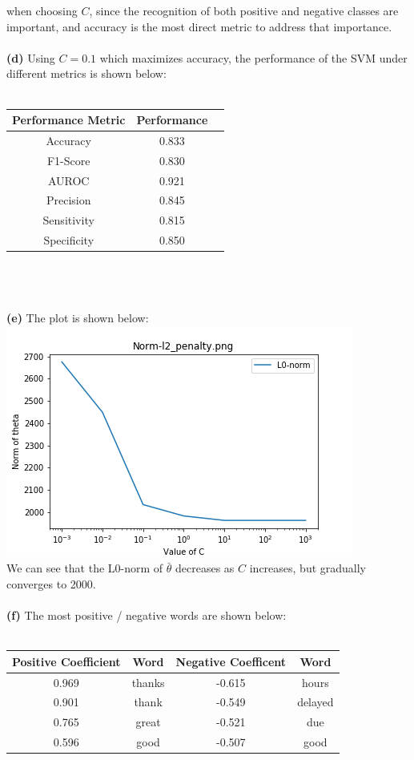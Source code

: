 \documentclass{article}
\begin{document}
when choosing $C$, since the recognition of both positive and negative classes
are important, and accuracy is the most direct metric to address that importance.\\ \\
\textbf{(d)} Using $C=0.1$ which maximizes accuracy, the performance of the SVM under different metrics is shown below: \\ \\
\begin{tabular}{|c|c|c|}
\hline
\bf Performance Metric & \bf Performance \\ \hline
Accuracy &  0.833 \\ \hline
F1-Score &  0.830 \\ \hline
AUROC &  0.921 \\ \hline
Precision &  0.845 \\ \hline
Sensitivity &  0.815 \\ \hline
Specificity &  0.850 \\ \hline
\end{tabular}\\ \\ \\
\textbf{(e)} The plot is shown below:\\
\includegraphics[width=.5\textwidth]{31e.png}\\
\indent We can see that the L0-norm of $\bar{\theta}$ decreases as $C$ increases,
but gradually converges to 2000.\\ \\
\textbf{(f)} The most positive / negative words are shown below:\\ \\
\begin{tabular}{|c|c||c|c|}
\hline
\bf Positive Coefficient & \bf Word & \bf Negative Coefficent & \bf Word\\ \hline
0.969 & thanks & -0.615 & hours \\ \hline
0.901 & thank & -0.549 & delayed \\ \hline
0.765 & great & -0.521 & due \\ \hline
0.596 & good & -0.507 & good \\ \hline
\end{tabular}\\ \\
\end{document}
